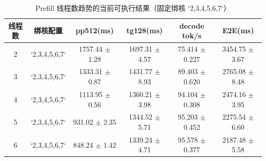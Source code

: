 \begin{table}[ht]
  \centering
  \caption{Prefill 线程数趋势的当前可执行结果（固定绑核 `2,3,4,5,6,7`）}
  \label{tab:prefill-thread-sweep}
  \begin{tabular}{c c c c c c}
    \hline
    线程数 & 绑核配置 & pp512(ms) & tg128(ms) & decode tok/s & E2E(ms) \\
    \hline
    2 & `2,3,4,5,6,7` & 1757.44 $\pm$ 1.28 & 1697.31 $\pm$ 4.57 & 75.414 $\pm$ 0.227 & 3454.75 $\pm$ 3.67 \\
    3 & `2,3,4,5,6,7` & 1333.31 $\pm$ 0.87 & 1431.77 $\pm$ 8.93 & 89.403 $\pm$ 0.620 & 2765.08 $\pm$ 8.48 \\
    4 & `2,3,4,5,6,7` & 1113.95 $\pm$ 0.56 & 1360.21 $\pm$ 3.98 & 94.104 $\pm$ 0.308 & 2474.16 $\pm$ 3.95 \\
    5 & `2,3,4,5,6,7` & 931.02 $\pm$ 2.35 & 1344.52 $\pm$ 5.71 & 95.203 $\pm$ 0.452 & 2275.54 $\pm$ 6.60 \\
    6 & `2,3,4,5,6,7` & 848.24 $\pm$ 1.42 & 1339.24 $\pm$ 4.71 & 95.578 $\pm$ 0.377 & 2187.48 $\pm$ 5.58 \\
    \hline
  \end{tabular}
\end{table}
